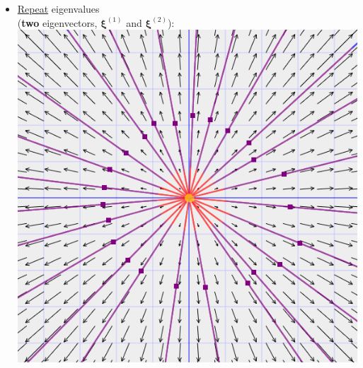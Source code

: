 \documentclass{article}
\begin{document}
\begin{multicols*}{3}
\begin{itemize}
        \item \underline{Repeat} eigenvalues \\
        (\textbf{two} eigenvectors,
        $\boldsymbol{\xi}^{(1)}$ and $\boldsymbol{\xi}^{(2)}$): \\
        \includegraphics*[scale=0.25]{f5.png}
    \end{itemize}
    
\end{multicols*}
\end{document}
